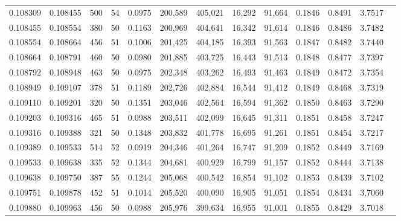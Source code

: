 \begin{tabular}{rrrrrrrrrrrrr}
0.108309 & 0.108455 &   500 &  54 &                                     0.0975 & 200,589 & 405,021 &  16,292 &  91,664 & 0.1846 & 0.8491 & 3.7517 \\
0.108455 & 0.108554 &   380 &  50 &                                     0.1163 & 200,969 & 404,641 &  16,342 &  91,614 & 0.1846 & 0.8486 & 3.7482 \\
0.108554 & 0.108664 &   456 &  51 &                                     0.1006 & 201,425 & 404,185 &  16,393 &  91,563 & 0.1847 & 0.8482 & 3.7440 \\
0.108664 & 0.108791 &   460 &  50 &                                     0.0980 & 201,885 & 403,725 &  16,443 &  91,513 & 0.1848 & 0.8477 & 3.7397 \\
0.108792 & 0.108948 &   463 &  50 &                                     0.0975 & 202,348 & 403,262 &  16,493 &  91,463 & 0.1849 & 0.8472 & 3.7354 \\
0.108949 & 0.109107 &   378 &  51 &                                     0.1189 & 202,726 & 402,884 &  16,544 &  91,412 & 0.1849 & 0.8468 & 3.7319 \\
0.109110 & 0.109201 &   320 &  50 &                                     0.1351 & 203,046 & 402,564 &  16,594 &  91,362 & 0.1850 & 0.8463 & 3.7290 \\
0.109203 & 0.109316 &   465 &  51 &                                     0.0988 & 203,511 & 402,099 &  16,645 &  91,311 & 0.1851 & 0.8458 & 3.7247 \\
0.109316 & 0.109388 &   321 &  50 &                                     0.1348 & 203,832 & 401,778 &  16,695 &  91,261 & 0.1851 & 0.8454 & 3.7217 \\
0.109389 & 0.109533 &   514 &  52 &                                     0.0919 & 204,346 & 401,264 &  16,747 &  91,209 & 0.1852 & 0.8449 & 3.7169 \\
0.109533 & 0.109638 &   335 &  52 &                                     0.1344 & 204,681 & 400,929 &  16,799 &  91,157 & 0.1852 & 0.8444 & 3.7138 \\
0.109638 & 0.109750 &   387 &  55 &                                     0.1244 & 205,068 & 400,542 &  16,854 &  91,102 & 0.1853 & 0.8439 & 3.7102 \\
0.109751 & 0.109878 &   452 &  51 &                                     0.1014 & 205,520 & 400,090 &  16,905 &  91,051 & 0.1854 & 0.8434 & 3.7060 \\
0.109880 & 0.109963 &   456 &  50 &                                     0.0988 & 205,976 & 399,634 &  16,955 &  91,001 & 0.1855 & 0.8429 & 3.7018 \\

\end{tabular}
